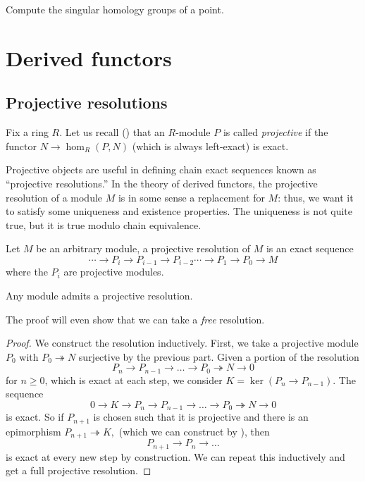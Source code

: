 \begin{exercise} Compute the singular homology groups of a
point. \end{exercise}

\section{Derived functors}
\subsection{Projective resolutions}

Fix a ring $R$.
Let us recall () that an $R$-module $P$ is called
\emph{projective} if the functor $N \to \hom_R(P,N)$ (which is always
left-exact) is exact.

Projective objects are useful in defining chain exact sequences
known as ``projective resolutions.'' In the theory of derived functors, the
projective resolution of a module $M$ is in some sense a replacement for $M$:
thus, we want it to satisfy some uniqueness and existence properties. The
uniqueness is not quite true, but it is true modulo chain equivalence.

\begin{definition} Let $M$ be an arbitrary module, a projective
resolution of
$M$ is an exact sequence
\begin{equation} \cdots\rightarrow P_i\rightarrow
P_{i-1}\rightarrow
P_{i-2}\cdots\rightarrow P_1\rightarrow P_0\rightarrow M
\end{equation} where
the $P_i$ are projective modules. \end{definition}


\begin{proposition} Any module admits a projective resolution. \end{proposition}
The proof will even show that we can take a \emph{free} resolution.
\begin{proof} 
We construct the resolution inductively. 
First, we take a projective module $P_0$ with $P_0 \twoheadrightarrow N$
surjective by the previous part.  Given a portion of the resolution
\[ P_n \to P_{n-1} \to \dots \to P_0 \twoheadrightarrow N \to 0  \]
for $n \geq 0$, which is exact at each step, we consider $K = \ker(P_n \to
P_{n-1})$. The sequence 
\[ 0 \to K \to P_n \to P_{n-1} \to \dots \to P_0 \twoheadrightarrow N \to 0  \]
is exact. So if $P_{n+1}$ is chosen such that it is projective and there is an
epimorphism
\( P_{n+1} \twoheadrightarrow K,  \)
(which we can construct by ), then
\[ P_{n+1} \to P_n \to \dots  \]
is exact at every new step by construction. We can repeat this inductively and
get a full projective resolution.
\end{proof}

